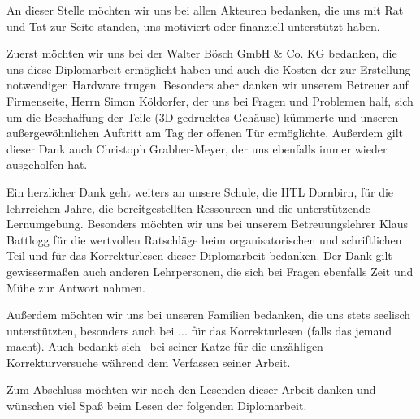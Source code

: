 \noindent An dieser Stelle möchten wir uns bei allen Akteuren bedanken, die uns mit Rat und Tat zur Seite standen, uns motiviert oder finanziell unterstützt haben.

Zuerst möchten wir uns bei der Walter Bösch GmbH \& Co. KG bedanken, die uns diese Diplomarbeit ermöglicht haben und auch die Kosten der zur Erstellung notwendigen Hardware trugen. Besonders aber danken wir unserem Betreuer auf Firmenseite, Herrn Simon Köldorfer, der uns bei Fragen und Problemen half, sich um die Beschaffung der Teile (\zB 3D gedrucktes Gehäuse) kümmerte und unseren außergewöhnlichen Auftritt am Tag der offenen Tür ermöglichte. Außerdem gilt dieser Dank auch Christoph Grabher-Meyer, der uns ebenfalls immer wieder ausgeholfen hat.

Ein herzlicher Dank geht weiters an unsere Schule, die HTL Dornbirn, für die lehrreichen Jahre, die bereitgestellten Ressourcen und die unterstützende Lernumgebung. Besonders möchten wir uns bei unserem Betreuungslehrer Klaus Battlogg für die wertvollen Ratschläge beim organisatorischen und schriftlichen Teil und für das Korrekturlesen dieser Diplomarbeit bedanken. Der Dank gilt gewissermaßen auch anderen Lehrpersonen, die sich bei Fragen ebenfalls Zeit und Mühe zur Antwort nahmen.

Außerdem möchten wir uns bei unseren Familien bedanken, die uns stets seelisch unterstützten, besonders auch bei ... für das Korrekturlesen (falls das jemand macht).
Auch bedankt sich \pezze\ bei seiner Katze für die unzähligen Korrekturversuche während dem Verfassen seiner Arbeit.

Zum Abschluss möchten wir noch den Lesenden dieser Arbeit danken und wünschen viel Spaß beim Lesen der folgenden Diplomarbeit.